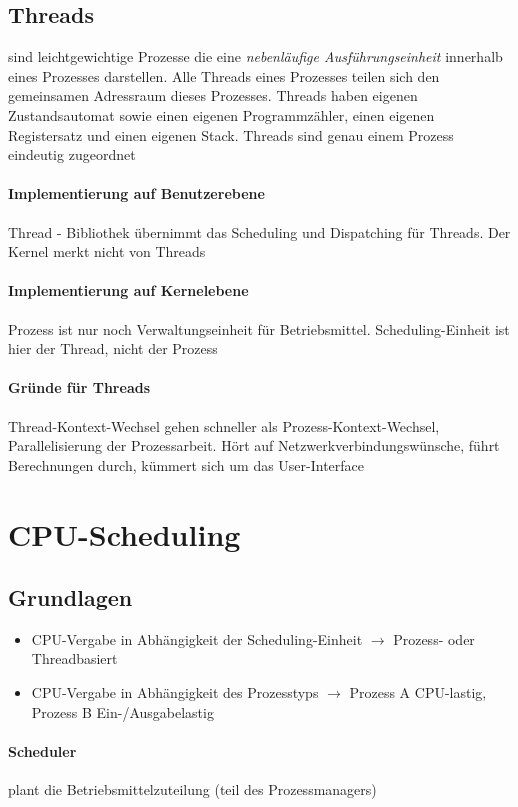 \documentclass[11pt,a4paper,landscape]{article}
\begin{document}
\begin{multicols*}{3}
	\subsection{Threads}
	sind leichtgewichtige Prozesse die eine \textit{nebenläufige Ausführungseinheit} innerhalb eines Prozesses darstellen. Alle Threads eines Prozesses teilen sich den gemeinsamen Adressraum dieses Prozesses. Threads haben eigenen Zustandsautomat sowie einen eigenen Programmzähler, einen eigenen Registersatz und einen eigenen Stack. Threads sind genau einem Prozess eindeutig zugeordnet
	\paragraph{Implementierung auf Benutzerebene} Thread - Bibliothek übernimmt das Scheduling und Dispatching für Threads. Der Kernel merkt nicht von Threads
	\paragraph{Implementierung auf Kernelebene} Prozess ist nur noch Verwaltungseinheit für Betriebsmittel. Scheduling-Einheit ist hier der Thread, nicht der Prozess
	\paragraph{Gründe für Threads} Thread-Kontext-Wechsel gehen schneller als Prozess-Kontext-Wechsel, Parallelisierung der Prozessarbeit. Hört auf Netzwerkverbindungswünsche, führt Berechnungen durch, kümmert sich um das User-Interface
	\section{CPU-Scheduling}
	\subsection{Grundlagen}
	\begin{itemize}
		\item CPU-Vergabe in Abhängigkeit der Scheduling-Einheit $\rightarrow$ Prozess- oder Threadbasiert
		\item CPU-Vergabe in Abhängigkeit des Prozesstyps $\rightarrow$ Prozess A CPU-lastig, Prozess B Ein-/Ausgabelastig
	\end{itemize}
	\paragraph{Scheduler} plant die Betriebsmittelzuteilung (teil des Prozessmanagers)

\end{multicols*}
\end{document}
